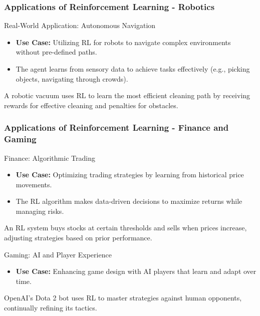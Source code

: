 \documentclass[aspectratio=169]{beamer}
\begin{document}
\begin{frame}[fragile]
    \frametitle{Applications of Reinforcement Learning - Robotics}
    \begin{block}{Real-World Application: Autonomous Navigation}
        \begin{itemize}
            \item \textbf{Use Case:} Utilizing RL for robots to navigate complex environments without pre-defined paths.
            \item The agent learns from sensory data to achieve tasks effectively (e.g., picking objects, navigating through crowds).
        \end{itemize}
    \end{block}
    \begin{example}
        A robotic vacuum uses RL to learn the most efficient cleaning path by receiving rewards for effective cleaning and penalties for obstacles.
    \end{example}
\end{frame}

\begin{frame}[fragile]
    \frametitle{Applications of Reinforcement Learning - Finance and Gaming}
    \begin{block}{Finance: Algorithmic Trading}
        \begin{itemize}
            \item \textbf{Use Case:} Optimizing trading strategies by learning from historical price movements.
            \item The RL algorithm makes data-driven decisions to maximize returns while managing risks.
        \end{itemize}
    \end{block}
    \begin{example}
        An RL system buys stocks at certain thresholds and sells when prices increase, adjusting strategies based on prior performance.
    \end{example}

    \begin{block}{Gaming: AI and Player Experience}
        \begin{itemize}
            \item \textbf{Use Case:} Enhancing game design with AI players that learn and adapt over time.
        \end{itemize}
    \end{block}
    \begin{example}
        OpenAI’s Dota 2 bot uses RL to master strategies against human opponents, continually refining its tactics.
    \end{example}
\end{frame}
\end{document}
